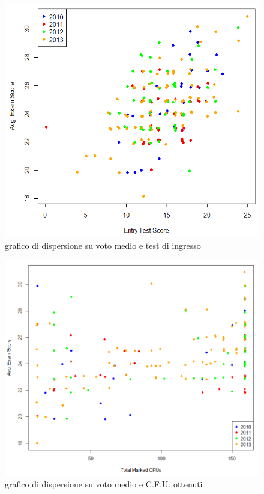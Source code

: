 \begin{figure}
    \centering
    \caption{grafico di dispersione su voto medio e test di ingresso}
    \label{fig2}
	\includegraphics[scale=0.5]{img/scatter_plot_2.png}
\end{figure}

\begin{figure}
    \centering
    \caption{grafico di dispersione su voto medio e C.F.U. ottenuti}
    \label{fig3}
	\includegraphics[scale=0.40]{img/scatter_plot_3.png}
\end{figure}

